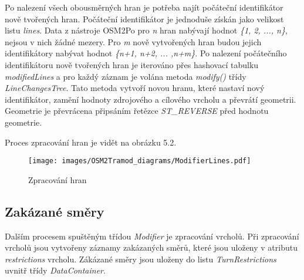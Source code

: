 Po nalezení všech obousměrných hran je potřeba najít počáteční identifikátor nově tvořených hran. Počáteční identifikátor je jednoduše získán jako velikost listu \textit{lines}. Data z nástroje OSM2Po pro \textit{n} hran nabývají hodnot \textit{\{1, 2, ..., n\}}, nejsou v nich žádné mezery. Pro \textit{m} nově vytvořených hran budou jejich identifikátory nabývat hodnot \textit{\{n+1, n+2, ... ,n+m\}}. Po nalezení počátečního identifikátoru nově tvořených hran je iterováno přes hashovací tabulku \textit{modifiedLines} a pro každý záznam je volána metoda \textit{modify()} třídy \textit{LineChangesTree}. Tato metoda vytvoří novou hranu, které nastaví nový identifikátor, zamění hodnoty zdrojového a cílového vrcholu a převrátí geometrii. Geometrie je převrácena připsáním řetězce \textit{ST\_REVERSE} před hodnotu geometrie. 

Proces zpracování hran je vidět na obrázku 5.2.

\begin{figure}[htbp]
\centering
\texttt{[image: images/OSM2Tramod\_diagrams/ModifierLines.pdf]}
\caption{Zpracování hran}
\end{figure}
\vspace{10pt}

\subsection{Zakázané směry}

Dalším procesem spuštěným třídou \textit{Modifier} je zpracování vrcholů. Při zpracování vrcholů jsou vytvořeny záznamy zakázaných směrů, které jsou uloženy v atributu \textit{restrictions} vrcholu. Zákázané směry jsou uloženy do listu \textit{TurnRestrictions} uvnitř třídy \textit{DataContainer}.

